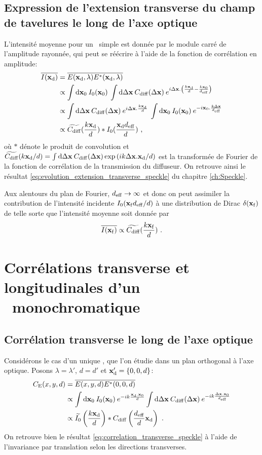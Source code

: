 \subsection{Expression de l'extension transverse du champ de tavelures le long de l'axe optique}
L'intensité moyenne pour un \speckle\ simple est donnée par le module carré de l'amplitude rayonnée, qui peut se réécrire à l'aide de la fonction de corrélation en amplitude:
\begin{align}
\overline{I(\mathbf{x}_{\mathrm{d}})} &= \overline{E(\mathbf{x}_{\mathrm{d}},\lambda)E^*(\mathbf{x}_{\mathrm{d}},\lambda)} \\
&\propto \int{\mathop{}\mathopen{}\mathrm{d}\mathbf{x}_0\: I_0(\mathbf{x}_0) \: \int{\mathop{}\mathopen{}\mathrm{d}\Delta\mathbf{x}\: C_{\mathrm{diff}}(\Delta\mathbf{x}) \: e^{i\Delta\mathbf{x}. \left( \frac{k\mathbf{x}_{\mathrm{d}}}{d}-\frac{k\mathbf{x}_0}{d_{\mathrm{eff}}}\right)}}} \\
&\propto \int{\mathop{}\mathopen{}\mathrm{d}\Delta\mathbf{x}\: C_{\mathrm{diff}}(\Delta\mathbf{x}) \: e^{i \Delta\mathbf{x}. \frac{k\mathbf{x}_{\mathrm{d}}}{d}} \: \int{\mathop{}\mathopen{}\mathrm{d}\mathbf{x}_0\: I_0(\mathbf{x}_0) \: e^{-i \mathbf{x}_0.\frac{k\Delta\mathbf{x}}{d_{\mathrm{eff}}}}}} \\
&\propto \widetilde{C_{\mathrm{diff}}}(\frac{k\mathbf{x}_{\mathrm{d}}}{d}) \ast I_0(\frac{\mathbf{x}_{\mathrm{d}}d_{\mathrm{eff}}}{d}) \text{ ,}
\end{align}
où $\ast$ dénote le produit de convolution et $\widetilde{C_{\mathrm{diff}}}(k\mathbf{x}_{\mathrm{d}}/d)=\int{\mathop{}\mathopen{}\mathrm{d}\Delta\mathbf{x}\:C_{\mathrm{diff}}(\Delta\mathbf{x})\exp{(ik\Delta\mathbf{x}.\mathbf{x}_{\mathrm{d}}/d)}}$ est la transformée de Fourier de la fonction de corrélation de la transmission du diffuseur. On retrouve ainsi le résultat \ref{eq:evolution_extension_transverse_speckle} du chapitre \ref{ch:Speckle}.

Aux alentours du plan de Fourier, $d_{\mathrm{eff}}\rightarrow\infty$ et donc on peut assimiler la contribution de l'intensité incidente $I_0(\mathbf{x}_{\mathrm{f}}d_{\mathrm{eff}}/d)$ à une distribution de Dirac $\delta(\mathbf{x}_{\mathrm{f}})$ de telle sorte que l'intensité moyenne soit donnée par
\begin{equation}
\overline{I(\mathbf{x}_{\mathrm{f}})} \propto \widetilde{C_{\mathrm{diff}}} (\frac{k\mathbf{x}_{\mathrm{f}}}{d}) \text{ .}
\end{equation}





\section{Corrélations transverse et longitudinales d'un \speckle\ monochromatique}%
\subsection{Corrélation transverse le long de l'axe optique}
Considérons le cas d'un unique \speckle , que l'on étudie dans un plan orthogonal à l'axe optique. Posons $\lambda = \lambda'$, $d=d'$ et $\mathbf{x}_{\mathrm{d}}'=\lbrace 0,0,d \rbrace$:
\begin{align}
C_{\mathrm{E}}(x,y,d)&=\overline{E(x,y,d)E^*(0,0,d)}\\
&\propto \int{\mathop{}\mathopen{}\mathrm{d}\mathbf{x}_0\: I_0(\mathbf{x}_0) \: e^{-ik\frac{\mathbf{x}_{\mathrm{d}}.\mathbf{x}_0}{d}} \int{\mathop{}\mathopen{}\mathrm{d}\Delta\mathbf{x}\: C_{\mathrm{diff}}(\Delta\mathbf{x})\: e^{-ik\frac{\Delta\mathbf{x}.\mathbf{x}_0}{d_{\mathrm{eff}}}}}}\\
&\propto \widetilde{I_0}\left(\frac{k\mathbf{x}_{\mathrm{d}}}{d}\right) \ast C_{\mathrm{diff}} \left( \frac{d_{\mathrm{eff}}}{d} \mathbf{x}_{\mathrm{d}}\right) \text{ .}
\end{align}
On retrouve bien le résultat \ref{eq:correlation_transverse_speckle} à l'aide de l'invariance par translation selon les directions transverses. 

